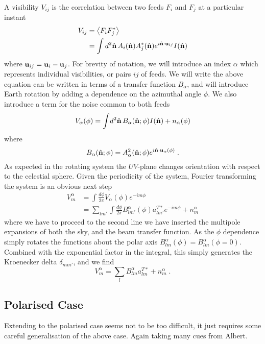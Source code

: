 \documentclass[onecolumn]{revtex4}
\begin{document}
A visibility $V_{ij}$ is the correlation between two feeds $F_i$ and $F_j$ at a
particular instant
\begin{align}
  V_{ij} & = \left\langle F_i F_j^* \right\rangle \\
  &= \int d^2\hat{\mathbf{n}} \, A_i(\hat{\mathbf{n}}) A_j^*(\hat{\mathbf{n}}) e^{i \hat{\mathbf{n}} \cdot \mathbf{u}_{ij}}
  I(\hat{\mathbf{n}})
\end{align}
where $\mathbf{u}_{ij} = \mathbf{u}_i - \mathbf{u}_j$. For brevity of notation, we will introduce an
index $\alpha$ which represents individual visibilities, or pairs $ij$ of
feeds. We will write the above equation can be written in terms of a transfer
function $B_\alpha$, and will introduce Earth rotation by adding a dependence on
the azimuthal angle $\phi$. We also introduce a term for the noise common to
both feeds
\begin{equation}
  V_\alpha(\phi) = \int \! d^2\hat{\mathbf{n}}\, B_\alpha(\hat{\mathbf{n}}; \phi) I(\hat{\mathbf{n}})
  + n_\alpha(\phi)
\end{equation}
where
\begin{equation}
  B_\alpha(\hat{\mathbf{n}}; \phi) = A_\alpha^2(\hat{\mathbf{n}}; \phi) e^{i \hat{\mathbf{n}} \cdot
    \mathbf{u}_{\alpha}(\phi)} \; .
\end{equation}
As expected in the rotating system the $UV$-plane changes orientation with
respect to the celestial sphere. Given the periodicity of the system, Fourier
transforming the system is an obvious next step
\begin{align}
  V^\alpha_m &= \int \frac{d\phi}{2\pi} V_\alpha(\phi) e^{-i m \phi} \\
  & = \sum_{l m'}\int \frac{d\phi}{2\pi} B^\alpha_{l m'}(\phi) a^{T*}_{l m'}
  e^{-i m \phi}+ n^\alpha_m
\end{align}
where we have to proceed to the second line we have inserted the multipole
expansions of both the sky, and the beam transfer function. As the $\phi$
dependence simply rotates the functions about the polar axis
$B^\alpha_{lm}(\phi) = B^{\alpha}_{lm}(\phi=0)$. Combined with the exponential
factor in the integral, this simply generates the Kroenecker delta
$\delta_{mm'}$, and we find
\begin{equation}
V^\alpha_m = \sum_{l} B^\alpha_{l m} a^{T*}_{l m}+ n^\alpha_m \; .
\end{equation}

\subsection{Polarised Case}

Extending to the polarised case seems not to be too difficult, it just requires
some careful generalisation of the above case. Again taking many cues from
Albert.
\end{document}
